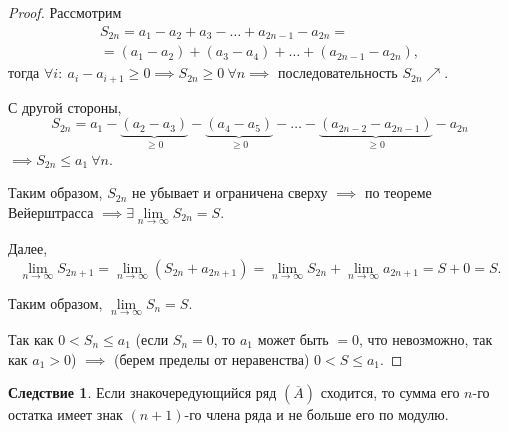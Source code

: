 \documentclass{report}
\theoremstyle{definition}
\newtheorem*{effect}{Следствие}
\begin{document}
\begin{proof}
  Рассмотрим
  \begin{multline*}
    S_{2n} = a_1 - a_2 + a_3 - \ldots + a_{2n - 1} - a_{2n} = \\
    = (a_1 - a_2) + (a_3 - a_4) + \ldots + (a_{2n-1} - a_{2n}),
  \end{multline*}
  тогда $\forall i: \ a_i - a_{i+1} \geqslant 0 \implies S_{2n}\geqslant 0 \ \forall n \implies$ последовательность $S_{2n} \nearrow$.

  С другой стороны,
  \begin{equation*}
    S_{2n} = a_1 - \underbrace{(a_2 - a_3)}_{\geqslant 0} - \underbrace{(a_4 - a_5)}_{\geqslant 0} - \ldots - \underbrace{(a_{2n-2} - a_{2n-1})}_{\geqslant0} - a_{2n}
  \end{equation*}
  $\implies S_{2n} \leqslant a_1 \ \forall n$.

  Таким образом, $S_{2n}$ не убывает и ограничена сверху $\implies$ по теореме Вейерштрасса $\implies \exists \underset{n\rightarrow\infty}{\lim} S_{2n} = S$.

  Далее,
  \begin{equation*}
    \underset{n\rightarrow\infty}{\lim}S_{2n+1} = \underset{n\rightarrow\infty}{\lim}(S_{2n} + a_{2n+1}) = \underset{n\rightarrow\infty}{\lim}S_{2n} + \underset{n\rightarrow\infty}{\lim} a_{2n+1} = S + 0 = S.
  \end{equation*}

  Таким образом, $\underset{n\rightarrow\infty}{\lim}S_n = S$.

  Так как $0 < S_n \leqslant a_1$ (если $S_n = 0$, то $a_1$ может быть $=0$, что невозможно, так как $a_1 > 0$) $\implies$ (берем пределы от неравенства) $0 < S \leqslant a_1$.
\end{proof}

\begin{effect}
  Если знакочередующийся ряд $(\overline{A})$ сходится, то сумма его $n$-го остатка имеет знак $(n+1)$-го члена ряда и не больше его по модулю.
\end{effect}
\end{document}
